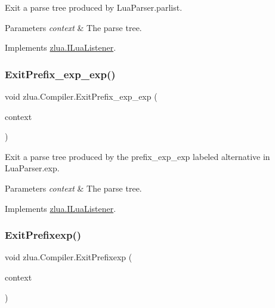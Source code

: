 Exit a parse tree produced by Lua\+Parser.\+parlist. 


\begin{DoxyParams}{Parameters}
{\em context} & The parse tree.\\
\hline
\end{DoxyParams}


Implements \mbox{\hyperlink{interfacezlua_1_1_i_lua_listener_a067b1e085ec7ffaab84c99f820ccd5fa}{zlua.\+I\+Lua\+Listener}}.

\mbox{\label{classzlua_1_1_compiler_a4ce4dbd75b95a42421f7686f9ff35382}} 
\subsubsection{\texorpdfstring{Exit\+Prefix\+\_\+exp\+\_\+exp()}{ExitPrefix\_exp\_exp()}}
{\footnotesize\ttfamily void zlua.\+Compiler.\+Exit\+Prefix\+\_\+exp\+\_\+exp (\begin{DoxyParamCaption}\item[{\mbox{[}\+Not\+Null\mbox{]} \mbox{\hyperlink{classzlua_1_1_lua_parser_1_1_prefix__exp__exp_context}{Lua\+Parser.\+Prefix\+\_\+exp\+\_\+exp\+Context}}}]{context }\end{DoxyParamCaption})}



Exit a parse tree produced by the {\ttfamily prefix\+\_\+exp\+\_\+exp} labeled alternative in Lua\+Parser.\+exp. 


\begin{DoxyParams}{Parameters}
{\em context} & The parse tree.\\
\hline
\end{DoxyParams}


Implements \mbox{\hyperlink{interfacezlua_1_1_i_lua_listener_a88094687ca2271e4cbef04c18a738b99}{zlua.\+I\+Lua\+Listener}}.

\mbox{\label{classzlua_1_1_compiler_aaed669e9529c2da870c27a0c3569651f}} 
\subsubsection{\texorpdfstring{Exit\+Prefixexp()}{ExitPrefixexp()}}
{\footnotesize\ttfamily void zlua.\+Compiler.\+Exit\+Prefixexp (\begin{DoxyParamCaption}\item[{\mbox{[}\+Not\+Null\mbox{]} \mbox{\hyperlink{classzlua_1_1_lua_parser_1_1_prefixexp_context}{Lua\+Parser.\+Prefixexp\+Context}}}]{context }\end{DoxyParamCaption})}



